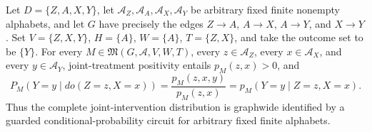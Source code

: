 Let \(D=\{Z,A,X,Y\}\), let \(\mathcal A_Z,\mathcal A_A,\mathcal A_X,\mathcal A_Y\) be arbitrary fixed finite nonempty alphabets, and let \(G\) have precisely the edges \(Z\to A\), \(A\to X\), \(A\to Y\), and \(X\to Y\).  Set \(V=\{Z,X,Y\}\), \(H=\{A\}\), \(W=\{A\}\), \(T=\{Z,X\}\), and take the outcome set to be \(\{Y\}\).  For every \(M\in\mathfrak M(G,\mathcal A,V,W,T)\), every \(z\in\mathcal A_Z\), every \(x\in\mathcal A_X\), and every \(y\in\mathcal A_Y\), joint-treatment positivity entails \(p_M(z,x)>0\), and
\[
 P_M(Y=y\mid do(Z=z,X=x))
 =\frac{p_M(z,x,y)}{p_M(z,x)}
 =p_M(Y=y\mid Z=z,X=x).
\]
Thus the complete joint-intervention distribution is graphwide identified by a guarded conditional-probability circuit for arbitrary fixed finite alphabets.